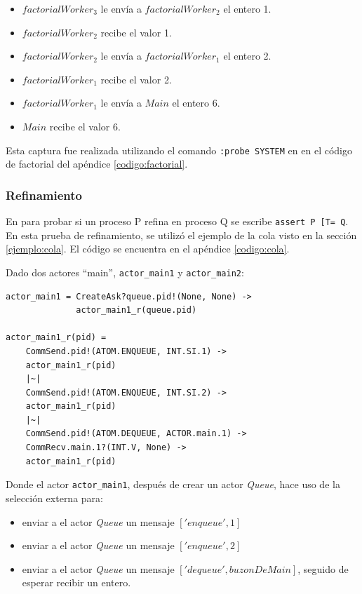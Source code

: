 \begin{itemize}
\item $factorialWorker_3$ le envía a $factorialWorker_2$ el entero 1.
\item $factorialWorker_2$ recibe el valor 1.

\item $factorialWorker_2$ le envía a $factorialWorker_1$ el entero 2.
\item $factorialWorker_1$ recibe el valor 2.

\item $factorialWorker_1$ le envía a $Main$ el entero 6.
\item $Main$ recibe el valor 6.

\end{itemize}

Esta captura fue realizada utilizando el comando \verb=:probe SYSTEM= en \FDR en el código de factorial del apéndice \ref{codigo:factorial}.

\subsubsection*{Refinamiento}

En \FDR para probar si un proceso P refina en proceso Q se escribe \verb$assert P [T= Q$. En esta prueba de refinamiento, se utilizó el ejemplo de la cola visto en la sección \ref{ejemplo:cola}. El código \CSPm se encuentra en el apéndice \ref{codigo:cola}.

Dado dos actores ``main'', \verb=actor_main1= y \verb=actor_main2=:

\begin{verbatim}
actor_main1 = CreateAsk?queue.pid!(None, None) ->
              actor_main1_r(queue.pid)

actor_main1_r(pid) =
    CommSend.pid!(ATOM.ENQUEUE, INT.SI.1) -> 
    actor_main1_r(pid) 
    |~| 
    CommSend.pid!(ATOM.ENQUEUE, INT.SI.2) -> 
    actor_main1_r(pid)
    |~| 
    CommSend.pid!(ATOM.DEQUEUE, ACTOR.main.1) -> 
    CommRecv.main.1?(INT.V, None) -> 
    actor_main1_r(pid)

\end{verbatim}
Donde el actor \verb=actor_main1=, después de crear un actor \textit{Queue}, hace uso de la selección externa para:
\begin{itemize}
 \item enviar a el actor \textit{Queue} un mensaje $['enqueue', 1]$
 \item enviar a el actor \textit{Queue} un mensaje $['enqueue', 2]$
 \item enviar a el actor \textit{Queue} un mensaje $['dequeue', buzonDeMain]$, seguido de esperar recibir un entero.
\end{itemize}

